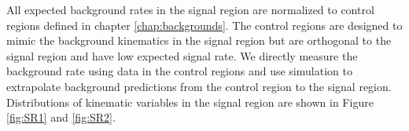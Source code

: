 \indent All expected background rates in the signal region are normalized to control regions defined in chapter \ref{chap:backgrounds}.  The control regions are designed to mimic the background kinematics in the signal region but are orthogonal to the signal region and have low expected signal rate.  We directly measure the background rate using data in the control regions and use simulation to extrapolate background predictions from the control region to the signal region. \\


%

%    
%    
%    
%    
%    

\indent Distributions of kinematic variables in the signal region are shown in Figure \ref{fig:SR1} and \ref{fig:SR2}.\\

